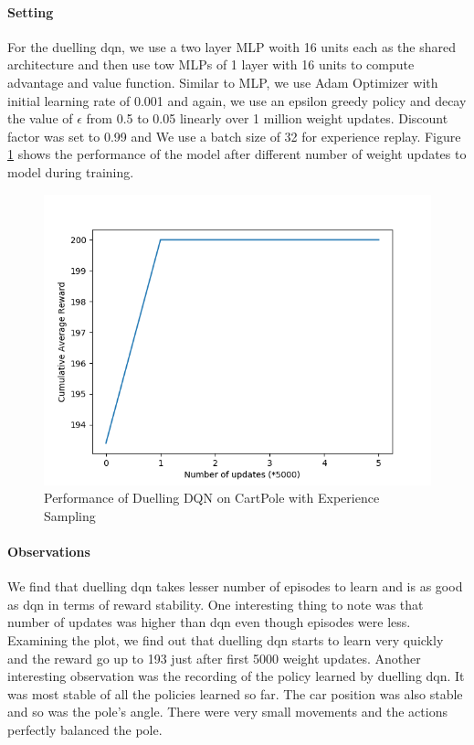 \documentclass[12pt]{article}
\begin{document}
\paragraph{Setting} For the duelling dqn, we use a two layer MLP woith 16 units each as the shared architecture and then use tow MLPs of 1 layer with 16 units to compute advantage and value function. Similar to MLP, we use Adam Optimizer with initial learning rate of 0.001 and again, we use an epsilon greedy policy and decay the value of $\epsilon$ from 0.5 to 0.05 linearly over 1 million weight updates. Discount factor was set to 0.99 and We use a batch size of 32 for experience replay. Figure \ref{fig:05} shows the performance of the model after different number of weight updates to model during training.
\begin{figure}[h]
  \centering
  \vspace{-5mm}
  \includegraphics[width=0.8\linewidth]{figures/reward_plot_05.png}
  \caption{Performance of Duelling DQN on CartPole with Experience Sampling}
  \label{fig:05}
\end{figure}
\paragraph{Observations} We find that duelling dqn takes lesser number of episodes to learn and is as good as dqn in terms of reward stability. One interesting thing to note was that number of updates was higher than dqn even though episodes were less. Examining the plot, we find out that duelling dqn starts to learn very quickly and the reward go up to 193 just after first 5000 weight updates. Another interesting observation was the recording of the policy learned by duelling dqn. It was most stable of all the policies learned so far. The car position was also stable and so was the pole's angle. There were very small movements and the actions perfectly balanced the pole. 
\end{document}
